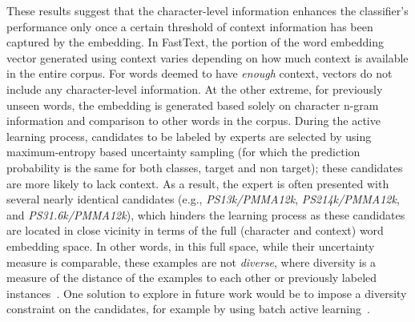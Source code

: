 These results suggest that the character-level information enhances the classifier's performance only once a certain threshold of context information has been captured by the embedding.
In FastText, the portion of the word embedding vector generated using context varies depending on how much context is available in the entire corpus. 
For words deemed to have \textit{enough} context, vectors do not include any character-level information. 
At the other extreme, for previously unseen words, the embedding is generated based solely on character n-gram information and comparison to other words in the corpus.
During the active learning process, candidates to be labeled by experts are selected by using maximum-entropy based uncertainty sampling (for which the prediction probability is the same for both classes, target and non target);
these candidates are more likely to lack context. %
As a result, the expert is often presented with several nearly identical candidates (e.g., \textit{PS13k/PMMA12k}, \textit{PS214k/PMMA12k}, and \textit{PS31.6k/PMMA12k}), which hinders the learning process as these candidates are located in close vicinity in terms of the full (character and context) word embedding space.
In other words, in this full space, while their uncertainty measure is comparable, these examples are not \textit{diverse}, where diversity is a measure of the distance of the examples to each other or previously labeled instances~\cite{brinker2003incorporating}.
One solution to explore in future work would be to impose a diversity constraint on the candidates,
for example by using batch active learning~\cite{settles2009active}.


